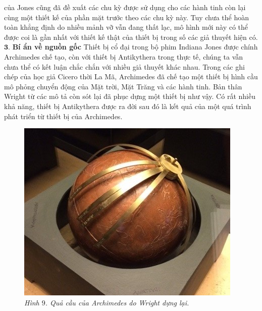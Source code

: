 	\begin{multicols}{2}
	của Jones cũng đã đề xuất các chu kỳ được sử dụng cho các hành tinh còn lại cùng một thiết kế của phần mặt trước theo các chu kỳ này. Tuy chưa thể hoàn toàn khẳng định do nhiều mảnh vỡ vẫn đang thất lạc, mô hình mới này có thể được coi là gần nhất với thiết kế thật của thiết bị trong số các giả thuyết hiện có. 
	\vskip 0.1cm
	$\pmb{3.}$ \textbf{\color{lichsutoanhoc}Bí ẩn về nguồn gốc}
	\vskip 0.1cm
	Thiết bị cổ đại trong bộ phim Indiana Jones được chính Archimedes chế tạo, còn với thiết bị Antikythera trong thực tế, chúng ta vẫn chưa thể có kết luận chắc chắn với nhiều giả thuyết khác nhau. Trong các ghi chép của học giả Cicero thời La Mã, Archimedes đã chế tạo một thiết bị hình cầu mô phỏng chuyển động của Mặt trời, Mặt Trăng và các hành tinh. Bản thân Wright từ các mô tả còn sót lại đã phục dựng một thiết bị như vậy. Có rất nhiều khả năng, thiết bị Antikythera được ra đời sau đó là kết quả của một quá trình phát triển từ thiết bị của Archimedes.
	\begin{figure}[H]
		\vspace*{-5pt}
		\centering
		\captionsetup{labelformat= empty, justification=centering}
		\includegraphics[width= 1\linewidth]{10}
		\caption{\small\textit{\color{lichsutoanhoc}Hình $9$. Quả cầu của Archimedes do Wright dựng lại.}}
		\vspace*{-5pt}
	\end{figure}
	\vskip 0.1cm
	\begin{figure}

\end{figure}
\end{multicols}
